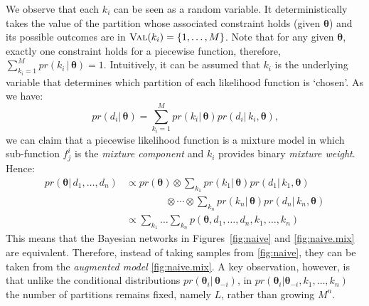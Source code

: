 We observe that each $k_i$ can be seen as a random variable. 
It deterministically takes the value of the partition whose associated constraint holds (given $\boldsymbol\theta$) and its possible outcomes are in $\textsc{Val}(k_i) = \{1, \ldots, M\}$. 
Note that for any given $\boldsymbol\theta$, exactly one constraint holds for a piecewise function, therefore, 
$\sum_{k_i = 1}^M pr(k_i \,|\, \boldsymbol\theta) = 1$.
Intuitively, it can be assumed that $k_i$ is the underlying variable that determines which partition of each likelihood function is `chosen'. As we have:
\begin{equation}
\label{e:aaaax}
pr(d_i | \, \boldsymbol\theta) = \sum_{k_i = 1}^M pr(k_i | \, \boldsymbol\theta) pr(d_i | \, k_i, \boldsymbol\theta) \text{,}
\end{equation}
we can claim that a piecewise likelihood function is a mixture model in which sub-function $f^i_j$ is the \emph{mixture component} and 
 $k_i$ provides binary \emph{mixture weight}. Hence:
{\small
\begin{align*}
pr(\boldsymbol\theta | \, d_1, \ldots, d_n) 
&\propto
pr(\boldsymbol\theta) \otimes
\sum_{k_1}pr(k_1 | \, \boldsymbol\theta) pr(d_1 | \, k_1, \boldsymbol\theta) \\
&\qquad\qquad \otimes
\cdots \otimes
\sum_{k_n}pr(k_n | \, \boldsymbol\theta) pr(d_n | \, k_n, \boldsymbol\theta)
\\
&\propto
\sum_{k_1} \ldots \sum_{k_n} p(\boldsymbol\theta, d_1, \ldots, d_n, k_1, \ldots, k_n) 
\end{align*}}
This means that the Bayesian networks in Figures~\ref{fig:naive} and \ref{fig:naive.mix} are equivalent.
Therefore, instead of taking samples from \ref{fig:naive}, 
they can be taken from the \emph{augmented model} \ref{fig:naive.mix}. A key observation, however, is that 
unlike the conditional distributions $pr(\boldsymbol\theta_i | \, \boldsymbol\theta_{-i})$, 
in $pr(\boldsymbol\theta_i | \boldsymbol\theta_{-i}, k_1, \ldots, k_n)$ 
the number of partitions remains fixed, namely $L$, rather than growing $M^n$.

